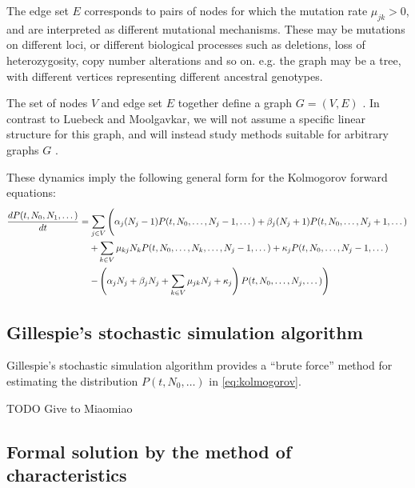 \documentclass{article}
\begin{document}
The edge set $E$ corresponds to pairs of nodes for which the mutation rate
$\mu_{jk} > 0$, and are interpreted as different mutational mechanisms. These may be
mutations on different loci, or different biological processes such as
deletions, loss of heterozygosity, copy number alterations and so on. 
e.g. the graph may be a tree, with different vertices representing different
ancestral genotypes.

The set of nodes $V$ and edge set $E$ together define a graph $G=(V,E)$
\cite{intrographs}. In contrast to Luebeck and Moolgavkar, we will not assume a
specific linear structure for this graph, and will instead study methods
suitable for arbitrary graphs $G$ \cite{moolgavkar1992multistage}.

These dynamics imply the following general form for the Kolmogorov forward
equations:
\begin{align}
    \frac{d P(t, N_0, N_1, \dots)}{dt} &=
    \sum_{j \in V} \left(
    \alpha_j (N_j - 1) P(t, N_0, \dots, N_j - 1, \dots)
    + \beta_j (N_j + 1) P(t, N_0, \dots, N_j + 1, \dots)
    \vphantom{\sum_a^b}
    \right.
    \nonumber \\
    &\quad \left. + \sum_{k \in V} \mu_{kj} N_k P(t, N_0, \dots, N_k, \dots,  N_j - 1, \dots)
    + \kappa_j P(t, N_0, \dots, N_j - 1, \dots)
    \right.
    \nonumber \\
    &\quad \left. 
    - \left(\alpha_j N_j + \beta_j N_j + \sum_{k \in V} \mu_{jk} N_j + \kappa_j\right)
    P(t, N_0, \dots, N_j, \dots)
    \vphantom{\sum_a^b}
    \right)
    \label{eq:kolmogorov}
\end{align}

\subsection{Gillespie's stochastic simulation algorithm}

Gillespie's stochastic simulation algorithm provides a ``brute force'' method
for estimating the distribution $P(t,N_0,\dots)$ in \eqref{eq:kolmogorov}.

TODO Give to Miaomiao


\subsection{Formal solution by the method of characteristics}

\end{document}
